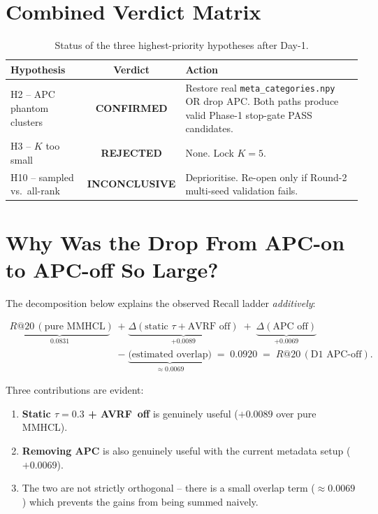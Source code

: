 \documentclass[11pt,a4paper]{article}
\newcommand{\NCL}{\cellcolor{warnyellow}\textbf{INCONCLUSIVE}}
\begin{document}
\section{Combined Verdict Matrix}

\begin{table}[h]
\centering
\renewcommand{\arraystretch}{1.3}
\begin{tabularx}{\textwidth}{|l|c|X|}
\hline
\textbf{Hypothesis} & \textbf{Verdict} & \textbf{Action} \\
\hline
H2  -- APC phantom clusters & \cellcolor{failred}\textbf{CONFIRMED} &
Restore real \texttt{meta\_categories.npy} OR drop APC. Both paths produce
valid Phase-1 stop-gate PASS candidates. \\
\hline
H3  -- $K$ too small        & \cellcolor{passgreen}\textbf{REJECTED}  &
None. Lock \(K=5\). \\
\hline
H10 -- sampled vs.\ all-rank & \NCL &
Deprioritise. Re-open only if Round-2 multi-seed validation fails. \\
\hline
\end{tabularx}
\caption{Status of the three highest-priority hypotheses after Day-1.}
\label{tab:verdict}
\end{table}

\section{Why Was the Drop From APC-on to APC-off So Large?}

The decomposition below explains the observed Recall ladder
\emph{additively}:

\begin{align*}
\underbrace{R@20\,(\text{pure MMHCL})}_{0.0831} \;
&+\; \underbrace{\Delta(\text{static } \tau\!+\!\text{AVRF off})}_{+0.0089} \;
+\; \underbrace{\Delta(\text{APC off})}_{+0.0069}\\[-2pt]
& -\; \underbrace{\text{(estimated overlap)}}_{\approx 0.0069}
 \;=\; 0.0920 \;=\; R@20\,(\text{D1 APC-off}).
\end{align*}

Three contributions are evident:
\begin{enumerate}[leftmargin=*]
  \item \textbf{Static $\tau=0.3$ + AVRF~off} is genuinely useful
        ($+0.0089$ over pure MMHCL).
  \item \textbf{Removing APC} is also genuinely useful with the current
        metadata setup ($+0.0069$).
  \item The two are not strictly orthogonal -- there is a small
        overlap term ($\approx 0.0069$) which prevents the gains from
        being summed naively.
\end{enumerate}
\end{document}

